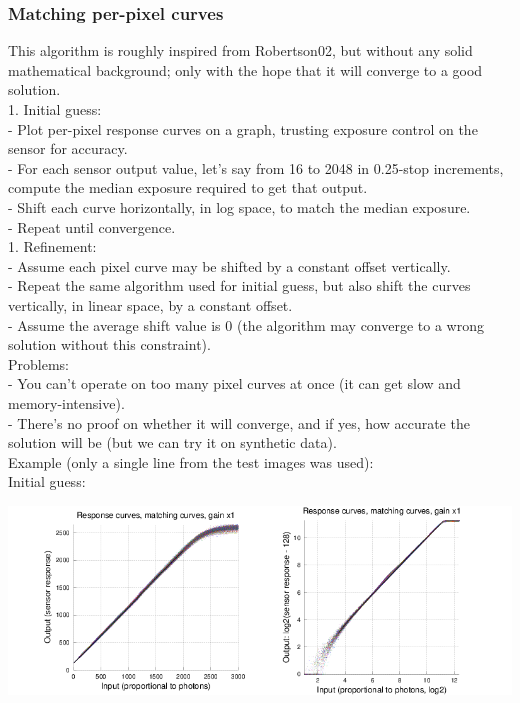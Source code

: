 \subsubsection{Matching per-pixel curves}

This algorithm is roughly inspired from Robertson02, but without any solid mathematical background; only with the hope that it will converge to a good solution.\\

1. Initial guess:\\

- Plot per-pixel response curves on a graph, trusting exposure control on the sensor for accuracy.\\
- For each sensor output value, let's say from 16 to 2048 in 0.25-stop increments, compute the median exposure required to get that output.\\
- Shift each curve horizontally, in log space, to match the median exposure.\\
- Repeat until convergence.\\
 
1. Refinement:\\

- Assume each pixel curve may be shifted by a constant offset vertically.\\
- Repeat the same algorithm used for initial guess, but also shift the curves vertically, in linear space, by a constant offset.\\
- Assume the average shift value is 0 (the algorithm may converge to a wrong solution without this constraint).\\

Problems:\\

- You can't operate on too many pixel curves at once (it can get slow and memory-intensive).\\
- There's no proof on whether it will converge, and if yes, how accurate the solution will be (but we can try it on synthetic data).\\ 

Example (only a single line from the test images was used): \\

Initial guess:\\

\begin{center}
\includegraphics[height=5cm]{images/response-curve-test-init}
\end{center}

